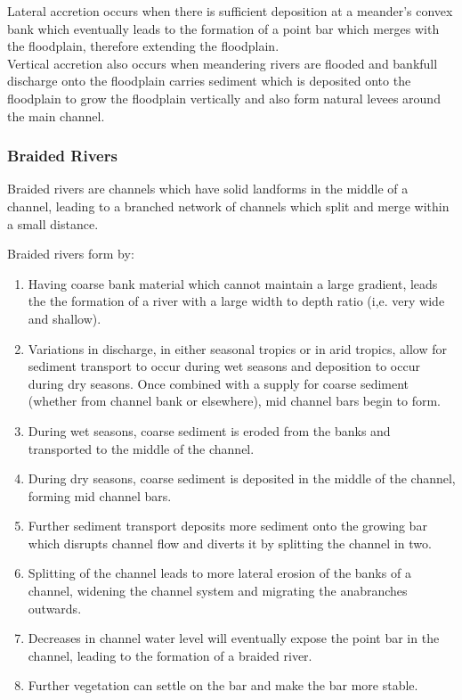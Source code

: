 \documentclass[../../main]{subfiles}
\begin{document}
	Lateral accretion occurs when there is sufficient deposition at a meander's convex bank which eventually leads to the formation of a point bar which merges with the floodplain, therefore extending the floodplain. \\

	Vertical accretion also occurs when meandering rivers are flooded and bankfull discharge onto the floodplain carries sediment which is deposited onto the floodplain to grow the floodplain vertically and also form natural levees around the main channel.

\subsubsection{Braided Rivers}

	Braided rivers are channels which have solid landforms in the middle of a channel, leading to a branched network of channels which split and merge within a small distance.

	Braided rivers form by:

	\begin{enumerate}
		\item Having coarse bank material which cannot maintain a large gradient, leads the the formation of a river with a large width to depth ratio (i,e. very wide and shallow).
		\item Variations in discharge, in either seasonal tropics or in arid tropics, allow for sediment transport to occur during wet seasons and deposition to occur during dry seasons. Once combined with a supply for coarse sediment (whether from channel bank or elsewhere), mid channel bars begin to form.
		\item During wet seasons, coarse sediment is eroded from the banks and transported to the middle of the channel.
		\item During dry seasons, coarse sediment is deposited in the middle of the channel, forming mid channel bars.
		\item Further sediment transport deposits more sediment onto the growing bar which disrupts channel flow and diverts it by splitting the channel in two.
		\item Splitting of the channel leads to more lateral erosion of the banks of a channel, widening the channel system and migrating the anabranches outwards.
		\item Decreases in channel water level will eventually expose the point bar in the channel, leading to the formation of a braided river.
		\item Further vegetation can settle on the bar and make the bar more stable.
	\end{enumerate}
\end{document}
